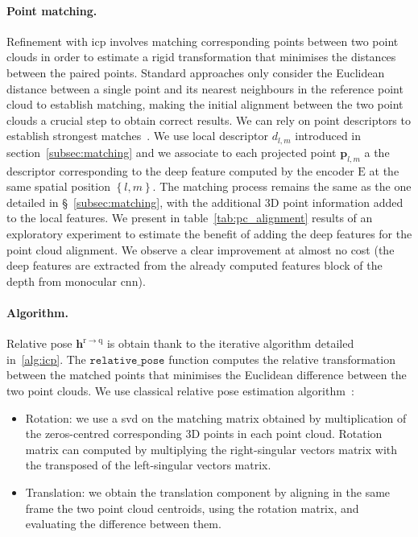 \paragraph{Point matching.}
\label{para:pc_matching}

Refinement with \ac{icp} involves matching corresponding points between two point clouds in order to estimate a rigid transformation that minimises the distances between the paired points. Standard approaches only consider the Euclidean distance between a single point and its nearest neighbours in the reference point cloud to establish matching, making the initial alignment between the two point clouds a crucial step to obtain correct results. We can rely on point descriptors to establish strongest matches~\cite{Pomerleau2015}. We use local descriptor $d_{l,m}$ introduced in section~\ref{subsec:matching} and we associate to each projected point $\mathbf{p}_{l,m}$ a the descriptor corresponding to the deep feature computed by the encoder $\mathrm{E}$ at the same spatial position $\left\{l,m\right\}$. The matching process remains the same as the one detailed in \S~\ref{subsec:matching}, with the additional 3D point information added to the local features. We present in table~\ref{tab:pc_alignment} results of an exploratory experiment to estimate the benefit of adding the deep features for the point cloud alignment. We observe a clear improvement at almost no cost (the deep features are extracted from the already computed features block of the depth from monocular \ac{cnn}).  

\paragraph{Algorithm.}
\label{para:pc_alignment}

Relative pose $\mathbf{h}^\mathrm{r \rightarrow q}$ is obtain thank to the iterative algorithm detailed in~\ref{alg:icp}. The $\mathtt{relative\_pose}$ function computes the relative transformation between the matched points that minimises the Euclidean difference between the two point clouds. We use classical relative pose estimation algorithm~\citep{Pomerleau2015}:  
\begin{itemize}
	\item Rotation: we use a \ac{svd} on the matching matrix obtained by multiplication of the zeros-centred corresponding 3D points in each point cloud. Rotation matrix can computed by multiplying the right-singular vectors matrix with the transposed of the left-singular vectors matrix.
	\item Translation: we obtain the translation component by aligning in the same frame the two point cloud centroids, using the rotation matrix, and evaluating the difference between them.
\end{itemize}

